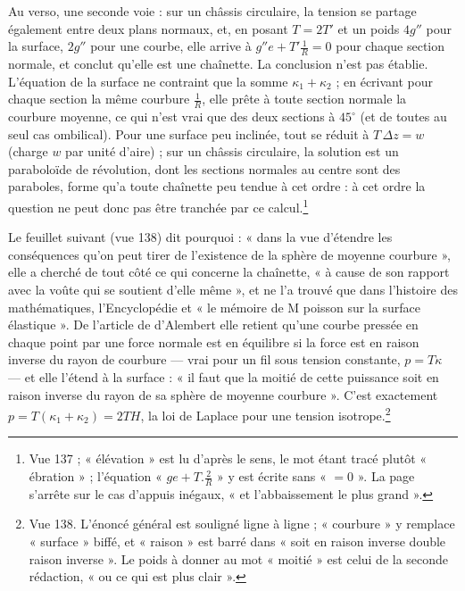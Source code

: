 \documentclass[11pt,a4paper]{article}
\begin{document}
Au verso, une seconde voie : sur un châssis circulaire, la tension se partage
également entre deux plans normaux, et, en posant $T = 2T'$ et un poids
$4g''$ pour la surface, $2g''$ pour une courbe, elle arrive à $g''e + T'\frac1R
= 0$ pour chaque section normale, et conclut qu'elle est une chaînette. La
conclusion n'est pas établie. L'équation de la surface ne contraint que la
somme $\kappa_1+\kappa_2$ ; en écrivant pour chaque section la même courbure
$\frac1R$, elle prête à toute section normale la courbure moyenne, ce qui n'est
vrai que des deux sections à $45^\circ$ (et de toutes au seul cas ombilical).
Pour une surface peu inclinée, tout se réduit à $T\,\Delta z = w$ (charge $w$
par unité d'aire) ; sur un châssis circulaire, la solution est un paraboloïde
de révolution, dont les sections normales au centre sont des paraboles, forme
qu'a toute chaînette peu tendue à cet ordre : à cet ordre la question ne peut
donc pas être tranchée par ce calcul.\footnote{Vue 137 ; « élévation » est lu
d'après le sens, le mot étant tracé plutôt « ébration » ; l'équation
« $ge + T.\frac2R$ » y est écrite sans « $= 0$ ». La page s'arrête sur le cas
d'appuis inégaux, « et l'abbaissement le plus grand ».}

Le feuillet suivant (vue 138) dit pourquoi : « dans la vue d'étendre les conséquences qu'on
peut tirer de l'existence de la sphère de moyenne courbure », elle a cherché de
tout côté ce qui concerne la chaînette, « à cause de son rapport avec la voûte
qui se soutient d'elle même », et ne l'a trouvé que dans l'histoire des
mathématiques, l'Encyclopédie et « le mémoire de M poisson sur la surface
élastique ». De l'article de d'Alembert elle retient qu'une courbe pressée en
chaque point par une force normale est en équilibre si la force est en raison
inverse du rayon de courbure — vrai pour un fil sous tension constante, $p =
T\kappa$ — et elle l'étend à la surface : « il faut que la moitié de cette
puissance soit en raison inverse du rayon de sa sphère de moyenne courbure ».
C'est exactement $p = T(\kappa_1+\kappa_2) = 2TH$, la loi de Laplace pour une
tension isotrope.\footnote{Vue 138. L'énoncé général est souligné ligne à ligne ;
« courbure » y remplace « surface » biffé, et « raison » est barré dans « soit en
raison inverse double raison inverse ». Le poids à donner au mot « moitié » est
celui de la seconde rédaction, « ou ce qui est plus clair ».}
\end{document}
